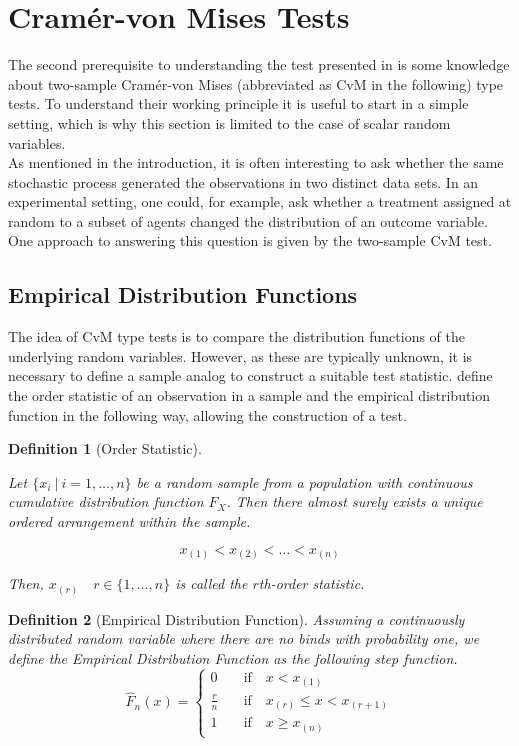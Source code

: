 \documentclass[12pt, a4paper]{article}
\theoremstyle{MAstyle} \newtheorem{assumption}{Assumption}[section]
\theoremstyle{MAstyle} \newtheorem{definition}{Definition}[section]
\theoremstyle{MAstyle} \newtheorem{theorem}{Theorem}[section]
\begin{document}
	\section{Cram\'{e}r-von Mises Tests}\label{CvM_Tests}
		The second prerequisite to understanding the test presented in \cite{bugni_permutation_2021} is some knowledge about two-sample Cram\'er-von Mises (abbreviated as CvM in the following) type tests. To understand their working principle it is useful to start in a simple setting, which is why this section is limited to the case of scalar random variables.\\
		
		As mentioned in the introduction, it is often interesting to ask whether the same stochastic process generated the observations in two distinct data sets. In an experimental setting, one could, for example, ask whether a treatment assigned at random to a subset of agents changed the distribution of an outcome variable. 
		One approach to answering this question is given by the two-sample CvM test. 

		\subsection{Empirical Distribution Functions}
			The idea of CvM type tests is to compare the distribution functions of the underlying random variables. However, as these are typically unknown, it is necessary to define a sample analog to construct a suitable test statistic.
			\cite{gibbons_nonparametric_2021} define the order statistic of an observation in a sample and the empirical distribution function in the following way, allowing the construction of a test.
			\begin{definition}[Order Statistic]\label{Order_Stat}
				
				Let $\{x_i \: \vert \: i = 1, \dots , n\}$ be a random sample from a population with continuous cumulative distribution function $F_X$. Then there almost surely exists a unique ordered arrangement within the sample. 
				
				$$x_{(1)} < x_{(2)} < \dots < x_{(n)}$$
				
				Then, $x_{(r)} \quad r \in \{1, \dots, n\}$ is called the $r$th-order statistic.	
			\end{definition}
		
			\begin{definition}[Empirical Distribution Function]
				Assuming a continuously distributed random variable where there are no binds with probability one, we define the Empirical Distribution Function as the following step function.
				\begin{equation}
					\hat{F}_{n}(x) = \begin{cases}
						0 & \quad \text{if} \quad  x < x_{(1)} \\
						\frac{r}{n} & \quad \text{if} \quad  x_{(r)} \leq x < x_{(r + 1)} \\
						1 & \quad \text{if} \quad  x \geq x_{(n)}
					\end{cases}
				\end{equation}
			\end{definition}
		
\end{document}
